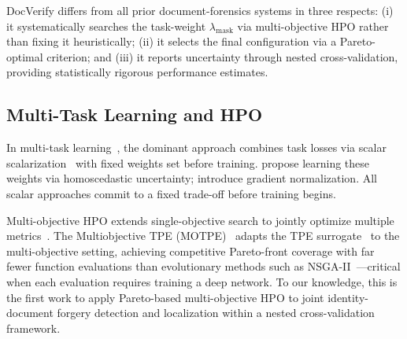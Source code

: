 DocVerify differs from all prior document-forensics systems in three respects:
(i) it systematically searches the task-weight $\lambda_{\text{mask}}$ via
multi-objective HPO rather than fixing it heuristically; (ii) it selects the
final configuration via a Pareto-optimal criterion; and (iii) it reports
uncertainty through nested cross-validation, providing statistically rigorous
performance estimates.

\subsection{Multi-Task Learning and HPO}

In multi-task learning~\citep{caruana1997multitask, ruder2017overview}, the
dominant approach combines task losses via scalar scalarization~\citep{marler2004survey}
with fixed weights set before training. \citet{kendall2018multi} propose
learning these weights via homoscedastic uncertainty; \citet{liu2019end}
introduce gradient normalization. All scalar approaches commit to a fixed
trade-off before training begins.

Multi-objective HPO extends single-objective search to jointly optimize multiple
metrics~\citep{miettinen1999nonlinear}. The Multiobjective TPE
(MOTPE)~\citep{motpe2022} adapts the TPE surrogate~\citep{tpe2011} to the
multi-objective setting, achieving competitive Pareto-front coverage with far
fewer function evaluations than evolutionary methods such as
NSGA-II~\citep{nsga2_2002}---critical when each evaluation requires training a
deep network. To our knowledge, this is the first work to apply Pareto-based
multi-objective HPO to joint identity-document forgery detection and
localization within a nested cross-validation framework.

